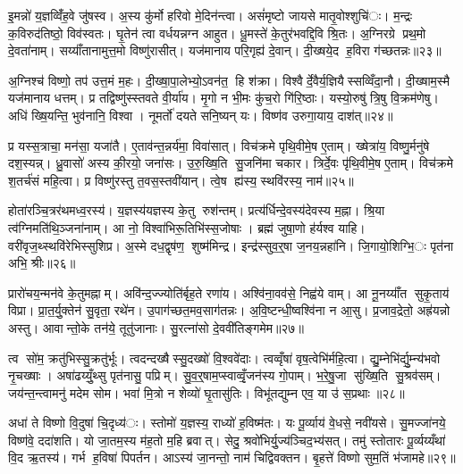 इ॒मन्नो॑ य॒ज्ञव्विँ॑ह॒वे जु॑षस्व। अ॒स्य कु॑र्मो हरिवो मे॒दिन॑न्त्वा। असं॑मृष्टो जायसे मातृ॒वोश्शुचि॑ः। म॒न्द्रः क॒विरुद॑तिष्ठो॒ विव॑स्वतः। घृ॒तेन॑ त्वा वर्धयन्नग्न आहुत। धू॒मस्ते॑ के॒तुर॑भवद्दि॒वि श्रि॒तः। अ॒ग्निरग्रे प्रथ॒मो दे॒वता॑नाम्। सय्याँ॑तानामुत्त॒मो विष्णु॑रासीत्। यज॑मानाय परि॒गृह्य॑ दे॒वान्। दी॒ख्षये॒द ह॒विरा ग॑च्छतन्नः॥२३॥

अ॒ग्निश्च॑ विष्णो॒ तप॑ उत्त॒मं म॒हः। दी॒ख्षा॒पा॒लेभ्यो॒ऽवन॑त॒ हि श॑क्रा। विश्वैर्दे॒वैर्य॒ज्ञियैस्सव्विँदा॒नौ। दी॒ख्षाम॒स्मै यज॑मानाय धत्तम्। प्र तद्विष्णु॑स्स्तवते वी॒र्या॑य। मृ॒गो न भी॒मः कु॑च॒रो गि॑रि॒ष्ठाः। यस्यो॒रुषु॑ त्रि॒षु वि॒क्रम॑णेषु। अधि॑ ख्षि॒यन्ति॒ भुव॑नानि॒ विश्वा। नूमर्तो॑ दयते सनि॒ष्यन् यः। विष्ण॑व उरुगा॒याय॒ दाश॑त्॥२४॥

प्र यस्स॒त्राचा॒ मन॑सा॒ यजा॑तै। ए॒ताव॑न्त॒न्नर्य॑मा॒ विवा॑सात्। विच॑क्रमे पृथि॒वीमे॒ष ए॒ताम्। ख्षेत्रा॑य॒ विष्णु॒र्मनु॑षे दश॒स्यन्न्। ध्रु॒वासो॑ अस्य की॒रयो॒ जना॑सः। उ॒रु॒ख्षि॒ति सु॒जनि॑मा चकार। त्रिर्दे॒वः पृ॑थि॒वीमे॒ष ए॒ताम्। विच॑क्रमे श॒तर्च॑सं महि॒त्वा। प्र विष्णु॑रस्तु त॒वस॒स्तवी॑यान्। त्वे॒ष ह्य॑स्य॒ स्थवि॑रस्य॒ नाम॑॥२५॥

होता॑रञ्चि॒त्रर॑थमध्व॒रस्य॑। य॒ज्ञस्य॑यज्ञस्य के॒तु रुश॑न्तम्। प्रत्य॑र्धिन्दे॒वस्य॑देवस्य म॒ह्ना। श्रि॒या त्व॑ग्निमति॑थि॒ञ्जना॑नाम्। आ नो॒ विश्वा॑भिरू॒तिभि॑स्स॒जोषाः। ब्रह्म॑ जुषा॒णो ह॑र्यश्व याहि। वरी॑वृज॒थ्स्थवि॑रेभिस्सुशिप्र। अ॒स्मे दध॒द्वृष॑ण॒ शुष्म॑मिन्द्र। इन्द्र॑स्सुव॒र्॒षा ज॒नय॒न्नहा॑नि। जि॒गायो॒शिग्भि॒ः पृत॑ना अभि॒ श्रीः॥२६॥

प्रारो॑चय॒न्मन॑वे के॒तुमह्नाम्। अवि॑न्द॒ज्ज्योति॑र्बृह॒ते रणा॑य। अश्वि॑ना॒वव॑से॒ निह्व॑ये वाम्। आ नू॒नय्याँ॑त सुकृ॒ताय॑ विप्रा। प्रा॒त॒र्यु॒क्तेन॑ सु॒वृता॒ रथे॑न। उ॒पाग॑च्छत॒मव॒साग॑तन्नः। अ॒वि॒ष्टन्धी॒ष्वश्वि॑ना न आ॒सु। प्र॒जाव॒द्रेतो॒ अह्र॑यन्नो अस्तु। आवान्तो॒के तन॑ये॒ तूतु॑जानाः। सु॒रत्ना॑सो दे॒ववी॑तिङ्गमेम॥२७॥

त्व सो॑म॒ क्रतु॑भिस्सु॒क्रतु॑र्भूः। त्वदन्दख्षैस्सु॒दख्षो॑ वि॒श्ववे॑दाः। त्वव्वृँषा॑ वृष॒त्वेभि॑र्महि॒त्वा। द्यु॒म्नेभि॑र्द्यु॒म्न्य॑भवो नृ॒चख्षाः। अषा॑ढय्युँ॒थ्सु पृत॑नासु॒ पप्रिम्। सु॒व॒र्॒षाम॒प्स्वाव्वृँ॒जन॑स्य गो॒पाम्। भ॒रे॒षु॒जा सु॑ख्षि॒ति सु॒श्रव॑सम्। जय॑न्त॒न्त्वामनु॑ मदेम सोम। भवा॑ मि॒त्रो न शेव्यो॑ घृ॒तासु॑तिः। विभू॑तद्युम्न एव॒ या उ॑ स॒प्रथाः॥२८॥

अधा॑ ते विष्णो वि॒दुषा॑ चि॒दृध्य॑ः। स्तोमो॑ य॒ज्ञस्य॒ राध्यो॑ ह॒विष्म॑तः। यः पू॒र्व्याय॑ वे॒धसे॒ नवी॑यसे। सु॒मज्जा॑नये॒ विष्ण॑वे॒ ददा॑शति। यो जा॒तम॒स्य म॑ह॒तो म॒हि ब्रवात्। सेदु॒ श्रवो॑भिर्यु॒ज्य॑ञ्चिद॒भ्य॑सत्। तमु॑ स्तोतारः पू॒र्व्यय्यँथा॑ वि॒द ऋ॒तस्य॑। गर्भ ह॒विषा॑ पिपर्तन। आऽस्य॑ जा॒नन्तो॒ नाम॑ चिद्विवक्तन। बृ॒हत्ते॑ विष्णो सुम॒तिं भ॑जामहे॥२९॥


